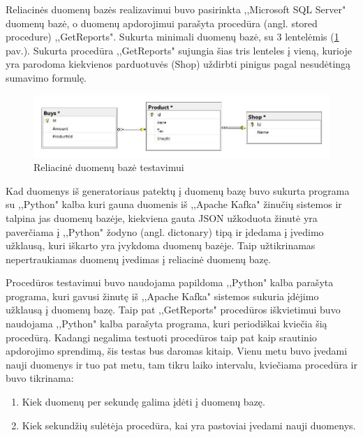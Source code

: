 \documentclass{VUMIFPSkursinis}
\begin{document}
Reliacinės duomenų bazės realizavimui buvo pasirinkta ,,Microsoft SQL Server" duomenų bazė, o duomenų apdorojimui parašyta procedūra (angl. stored procedure) ,,GetReports".
Sukurta minimali duomenų bazė, su 3 lentelėmis (\ref{fig:dbdiagram} pav.). Sukurta procedūra ,,GetReports" sujungia šias tris lenteles į vieną, kurioje yra parodoma kiekvienos 
parduotuvės (Shop) uždirbti pinigus pagal nesudėtingą sumavimo formulę.
\begin{figure}[!htbp]
    \centering
    \includegraphics[width=1\textwidth]{img/dbdiagram.jpg}
    \caption{Reliacinė duomenų bazė testavimui}
    \label{fig:dbdiagram}
\end{figure}
Kad duomenys iš generatoriaus patektų į duomenų bazę buvo sukurta programa su ,,Python" kalba kuri gauna duomenis iš ,,Apache Kafka" žinučių sistemos ir talpina jas
duomenų bazėje, kiekviena gauta JSON užkoduota žinutė yra paverčiama į ,,Python" žodyno (angl. dictonary) tipą ir įdedama į įvedimo užklausą, kuri iškarto yra 
įvykdoma duomenų bazėje. Taip užtikrinamas nepertraukiamas duomenų įvedimas į reliacinė duomenų bazę.\par
Procedūros testavimui buvo naudojama papildoma ,,Python" kalba parašyta programa, kuri gavusi žinutę iš ,,Apache Kafka" sistemos sukuria įdėjimo užklausą į duomenų bazę.
Taip pat ,,GetReports" procedūros iškvietimui buvo naudojama ,,Python" kalba parašyta programa, kuri periodiškai kviečia šią procedūrą. 
Kadangi negalima testuoti procedūros taip pat kaip srautinio apdorojimo sprendimą, šis testas bus daromas kitaip.
Vienu metu buvo įvedami nauji duomenys ir tuo pat metu, tam tikru laiko intervalu, kviečiama procedūra ir buvo tikrinama:
    \begin{enumerate}
        \item Kiek duomenų per sekundę galima įdėti į duomenų bazę.
        \item Kiek sekundžių sulėtėja procedūra, kai yra pastoviai įvedami nauji duomenys.
    \end{enumerate}
\end{document}
